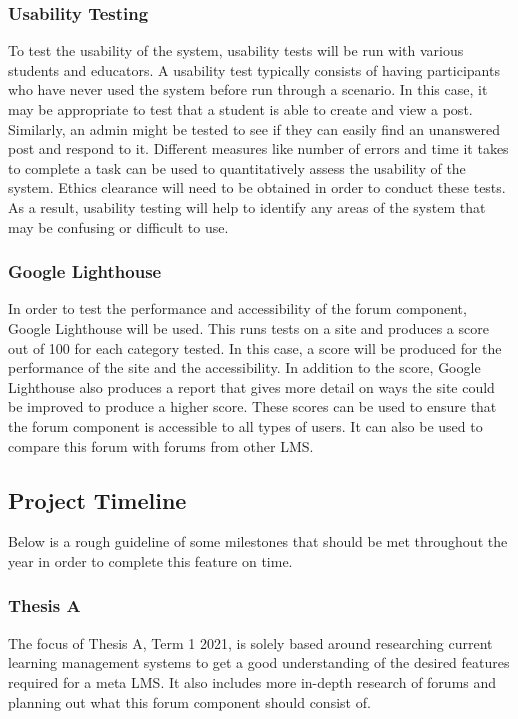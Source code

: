 \subsubsection{Usability Testing}
To test the usability of the system, usability tests will be run with various students and educators.
A usability test typically consists of having participants who have never used the system before run through a scenario.
In this case, it may be appropriate to test that a student is able to create and view a post.
Similarly, an admin might be tested to see if they can easily find an unanswered post and respond to it.
Different measures like number of errors and time it takes to complete a task can be used to quantitatively assess the usability of the system.
Ethics clearance will need to be obtained in order to conduct these tests.
As a result, usability testing will help to identify any areas of the system that may be confusing or difficult to use.

\subsubsection{Google Lighthouse}
In order to test the performance and accessibility of the forum component, Google Lighthouse will be used.
This runs tests on a site and produces a score out of 100 for each category tested.
In this case, a score will be produced for the performance of the site and the accessibility.
In addition to the score, Google Lighthouse also produces a report that gives more detail on ways the site could be improved to produce a higher score.
These scores can be used to ensure that the forum component is accessible to all types of users.
It can also be used to compare this forum with forums from other LMS.

\subsection{Project Timeline}
Below is a rough guideline of some milestones that should be met throughout the year in order to complete this feature on time.

\subsubsection{Thesis A}
The focus of Thesis A, Term 1 2021, is solely based around researching current learning management systems to get a good understanding of the desired features required for a meta LMS.
It also includes more in-depth research of forums and planning out what this forum component should consist of.

